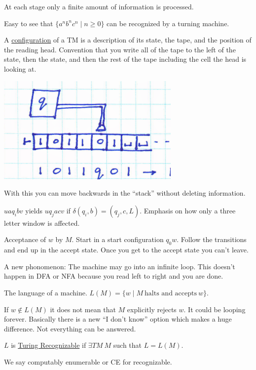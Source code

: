 \documentclass[../598comp.tex]{subfiles}
\begin{document}
At each stage only a finite amount of information is processed.

Easy to see that $\{a^nb^nc^n \mid n \geq 0\}$ can be recognized by a turning
machine.

A \ul{configuration} of a TM is a description of its state, the tape, and the
position of the reading head. Convention that you write all of the tape to the
left of the state, then the state, and then the rest of the tape including the
cell the head is looking at.

\includegraphics[width=\textwidth]{example_configuration}

With this you can move backwards in the ``stack'' without deleting information.

$uaq_ibv$ yields $uq_jacv$ if $\delta(q_i, b) = (q_j, c, L)$. Emphasis on how
only a three letter window is affected.

Acceptance of $w$ by $M$. Start in a start configuration $q_0w$. Follow the
transitions and end up in the accept state. Once you get to the accept state you
can't leave.

A new phonomenon: The machine may go into an infinite loop. This doesn't happen
in DFA or NFA because you read left to right and you are done.

The language of a machine. $L(M) = \{ w \mid M \ \text{halts and accepts} \ w\}$.

If $w \notin L(M)$ it does not mean that $M$ explicitly rejects $w$. It could be
looping forever. Basically there is a new ``I don't know'' option which makes a
huge difference. Not everything can be answered.

\begin{definition}
  $L$ is \ul{Turing Recognizable} if $\exists TM \ M$ such that $L = L(M)$.

  We say computably enumerable or CE for recognizable.
\end{definition}
\end{document}
